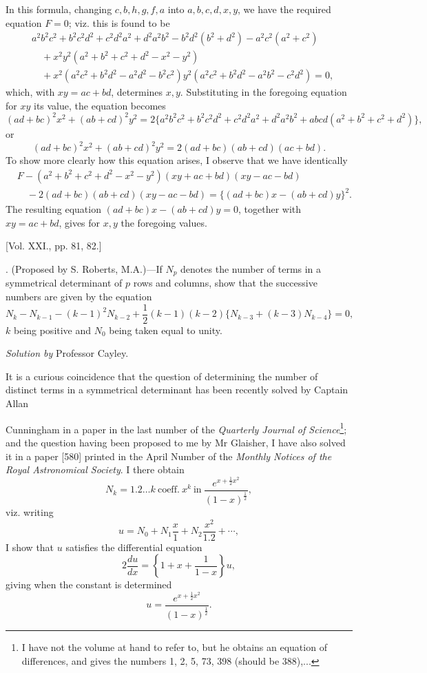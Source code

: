 \documentclass[10pt,twoside]{article}
\begin{document}
In this formula, changing \(c,b,h,g,f,a\) into \(a,b,c,d,x,y\), we have the required equation \(F=0\); viz. this is found to be
\[
\begin{split}
&a^2b^2c^2+b^2c^2d^2+c^2d^2a^2+d^2a^2b^2-b^2d^2(b^2+d^2)-a^2c^2(a^2+c^2)\\
&\quad+x^2y^2(a^2+b^2+c^2+d^2-x^2-y^2)\\
&\quad+x^2(a^2c^2+b^2d^2-a^2d^2-b^2c^2)
y^2(a^2c^2+b^2d^2-a^2b^2-c^2d^2)=0,
\end{split}
\]
which, with \(xy=ac+bd\), determines \(x,y\). Substituting in the foregoing equation for \(xy\) its value, the equation becomes
\[
(ad+bc)^2x^2+(ab+cd)^2y^2
=2\{a^2b^2c^2+b^2c^2d^2+c^2d^2a^2+d^2a^2b^2+abcd(a^2+b^2+c^2+d^2)\},
\]
or
\[
(ad+bc)^2x^2+(ab+cd)^2y^2
=2(ad+bc)(ab+cd)(ac+bd).
\]
To show more clearly how this equation arises, I observe that we have identically
\[
\begin{split}
&F-(a^2+b^2+c^2+d^2-x^2-y^2)(xy+ac+bd)(xy-ac-bd)\\
&\quad-2(ad+bc)(ab+cd)(xy-ac-bd)
=\{(ad+bc)x-(ab+cd)y\}^2.
\end{split}
\]
The resulting equation \((ad+bc)x-(ab+cd)y=0\), together with \(xy=ac+bd\), gives for \(x,y\) the foregoing values.

\bigskip
\begin{center}
[Vol. XXI., pp. 81, 82.]
\end{center}

. (Proposed by S. Roberts, M.A.)---If \(N_p\) denotes the number of terms in a symmetrical determinant of \(p\) rows and columns, show that the successive numbers are given by the equation
\[
N_k-N_{k-1}-(k-1)^2N_{k-2}
+\frac{1}{2}(k-1)(k-2)\{N_{k-3}+(k-3)N_{k-4}\}=0,
\]
\(k\) being positive and \(N_0\) being taken equal to unity.

\bigskip
\begin{center}
\textit{Solution by} Professor Cayley.
\end{center}

It is a curious coincidence that the question of determining the number of distinct terms in a symmetrical determinant has been recently solved by Captain Allan
\newpage

\noindent Cunningham in a paper in the last number of the \textit{Quarterly Journal of Science}\footnote{I have not the volume at hand to refer to, but he obtains an equation of differences, and gives the numbers 1, 2, 5, 73, 398 (should be 388),...}; and the question having been proposed to me by Mr Glaisher, I have also solved it in a paper [580] printed in the April Number of the \textit{Monthly Notices of the Royal Astronomical Society}. I there obtain
\[
N_k=1.2\ldots k\ \mathrm{coeff.}\ x^k\ \mathrm{in}\ 
\frac{e^{x+\frac{1}{2}x^2}}{(1-x)^{\frac{1}{2}}},
\]
viz. writing
\[
u=N_0+N_1\frac{x}{1}+N_2\frac{x^2}{1.2}+\cdots,
\]
I show that \(u\) satisfies the differential equation
\[
2\frac{du}{dx}=\left\{1+x+\frac{1}{1-x}\right\}u,
\]
giving when the constant is determined
\[
u=\frac{e^{x+\frac{1}{2}x^2}}{(1-x)^{\frac{1}{2}}}.
\]
\end{document}
